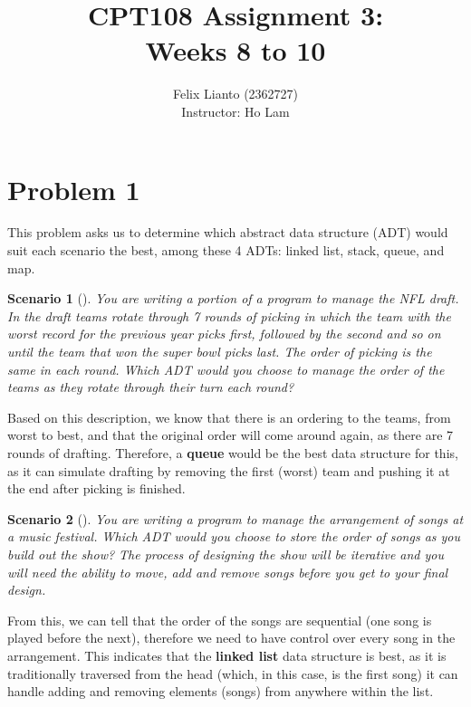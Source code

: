 \documentclass{report}
\newtheorem{scenario}{Scenario}
\begin{document}
	\title{\textbf{CPT108 Assignment 3:} \\ Weeks 8 to 10}
	\author{Felix Lianto (2362727) \\
		[1cm]{Instructor: Ho Lam}}
	\maketitle

\section*{Problem 1}
This problem asks us to determine which abstract data structure (ADT) would suit each scenario the best, among these 4 ADTs: linked list, stack, queue, and map.
\begin{scenario}[\autocite{lamAssignment3Weeks}]
	You are writing a portion of a program to manage the NFL draft. In the draft
	teams rotate through 7 rounds of picking in which the team with the worst
	record for the previous year picks first, followed by the second and so on
	until the team that won the super bowl picks last. The order of picking is
	the same in each round. Which ADT would you choose to manage the order
	of the teams as they rotate through their turn each round?
\end{scenario}
Based on this description, we know that there is an ordering to the teams, from worst to best, and that the original order will come around again, as there are 7 rounds of drafting. Therefore, a \textbf{queue} would be the best data structure for this, as it can simulate drafting by removing the first (worst) team and pushing it at the end after picking is finished.

\begin{scenario}[\autocite{lamAssignment3Weeks}]
	You are writing a program to manage the arrangement of songs at a music
	festival. Which ADT would you choose to store the order of songs as you
	build out the show? The process of designing the show will be iterative and
	you will need the ability to move, add and remove songs before you get to
	your final design.
\end{scenario}
From this, we can tell that the order of the songs are sequential (one song is played before the next), therefore we need to have control over every song in the arrangement. This indicates that the \textbf{linked list} data structure is best, as it is traditionally traversed from the head (which, in this case, is the first song) it can handle adding and removing elements (songs) from anywhere within the list.
\end{document}
